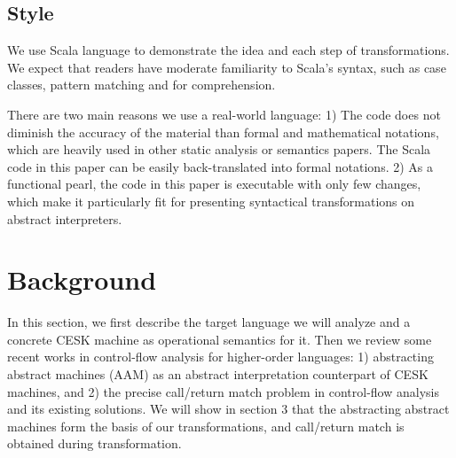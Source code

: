\documentclass[acmsmall,review,anonymous]{acmart}\settopmatter{printfolios=true,printccs=false,printacmref=false}
\begin{document}

\subsection{Style}

We use Scala language to demonstrate the idea and each step of transformations.
We expect that readers have moderate familiarity to Scala's syntax, such as
case classes, pattern matching and for comprehension.

There are two main reasons we use a real-world language:
1) The code does not diminish the accuracy of the material
than formal and mathematical notations, 
which are heavily used in other static analysis or semantics papers.
The Scala code in this paper can be easily back-translated into formal notations.
2) As a functional pearl, the code in this paper is executable with only few changes, 
which make it particularly fit for presenting syntactical transformations on abstract
interpreters.

\section{Background} \label{background}

In this section, we first describe the target language we will
analyze and a concrete CESK machine as operational semantics for it.
Then we review some recent works in control-flow analysis for
higher-order languages:
1) abstracting abstract machines (AAM) as an abstract interpretation
counterpart of CESK machines, and
2) the precise call/return match problem in control-flow analysis and its existing solutions.
We will show in section 3 that the abstracting abstract machines form the basis of our transformations,
and call/return match is obtained during transformation.
\end{document}

